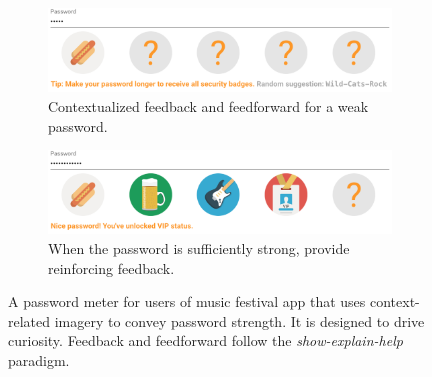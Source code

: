\begin{figure}
	\centering
	\begin{subfigure}[t]{\linewidth}
	\includegraphics[width=\linewidth]{figures/summary/context-meter-01}
	\caption{\label{fig:summary:context-meter-01}Contextualized feedback and feedforward for a weak password.}
	\end{subfigure}
	\begin{subfigure}[t]{\linewidth}
	\includegraphics[width=\linewidth]{figures/summary/context-meter-04}
	\caption{\label{fig:summary:context-meter-04}When the password is sufficiently strong, provide reinforcing feedback.}
	\end{subfigure}
	\caption{\label{fig:summary:context-meter}A password meter for users of music festival app that uses context-related imagery to convey password strength. It is designed to drive curiosity. Feedback and feedforward follow the \textit{show-explain-help} paradigm.}
\end{figure}

%

